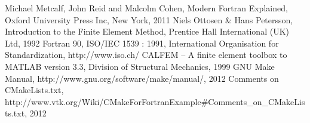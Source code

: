 \begin{thebibliography}{}
 Michael Metcalf, John Reid and Malcolm Cohen, Modern Fortran Explained, Oxford University Press Inc, New York, 2011
 Niels Ottosen \& Hans Petersson, Introduction to the Finite Element Method, Prentice Hall International (UK) Ltd, 1992
 Fortran 90, ISO/IEC 1539 : 1991, International Organisation for Standardization, http://www.iso.ch/
 CALFEM -- A finite element toolbox to MATLAB version 3.3, Division of Structural Mechanics, 1999
 GNU Make Manual, http://www.gnu.org/software/make/manual/, 2012
 Comments on CMakeLists.txt, http://www.vtk.org/Wiki/CMakeForFortranExample\#Comments\_on\_CMakeLists.txt, 2012
\end{thebibliography}
